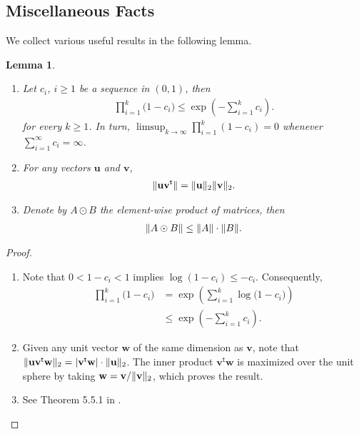 \documentclass{article}
\newcommand*{\bfu}{\mathbf{u}}
\newcommand*{\bfv}{\mathbf{v}}
\newcommand*{\bfw}{\mathbf{w}}
\newcommand*{\tran}{^{\mathsf{t}}}
\DeclarePairedDelimiter{\abs}{\lvert}{\rvert}
\DeclarePairedDelimiter{\norm}{\lVert}{\rVert}
\newtheorem{lemma}{Lemma}[section]
\begin{document}
\subsection{Miscellaneous Facts}

We collect various useful results in the following lemma.

\begin{lemma}
  \begin{enumerate}
    \item Let $c_i$, $i \geq 1$ be a sequence in $(0, 1)$, then
      \begin{align*}
        \prod_{i = 1}^k \big(1 - c_i\big) \leq \exp\left(- \sum_{i = 1}^k c_i\right).
      \end{align*} for every $k \geq 1$. In turn, $\limsup_{k \to \infty}
      \prod_{i = 1}^k (1 - c_i) = 0$ whenever $\sum_{i = 1}^\infty c_i =
      \infty$. \label{lem::misc_a}
    \item For any vectors $\bfu$ and $\bfv$, \begin{align*}
        \norm{\bfu \bfv\tran} = \norm{\bfu}_2 \norm{\bfv}_2.
      \end{align*} \label{lem::misc_b}
    \item Denote by $A \odot B$ the element-wise product of matrices, then
      \begin{align*}
        \norm{A \odot B} \leq \norm{A} \cdot \norm{B}.
      \end{align*} \label{lem::misc_c}
  \end{enumerate}
\end{lemma}

\begin{proof}
  \begin{enumerate}
    \item Note that $0 < 1 - c_i < 1$ implies $\log(1 - c_i) \leq - c_i$.
      Consequently, \begin{align*}
        \prod_{i = 1}^k \big(1 - c_i\big) &= \exp \left(\sum_{i = 1}^k
        \log\big(1 - c_i\big)\right)\\
        &\leq \exp \left(- \sum_{i = 1}^k c_i\right).
      \end{align*}
    \item Given any unit vector $\bfw$ of the same dimension as $\bfv$, note
      that $\norm{\bfu \bfv\tran \bfw}_2 = \abs{\bfv\tran \bfw} \cdot
      \norm{\bfu}_2$. The inner product $\bfv\tran \bfw$ is maximized over the
      unit sphere by taking $\bfw = \bfv / \norm{\bfv}_2$, which proves the
      result.
    \item See Theorem 5.5.1 in \cite{horn_johnson_1991}.
  \end{enumerate}
\end{proof}
\end{document}

